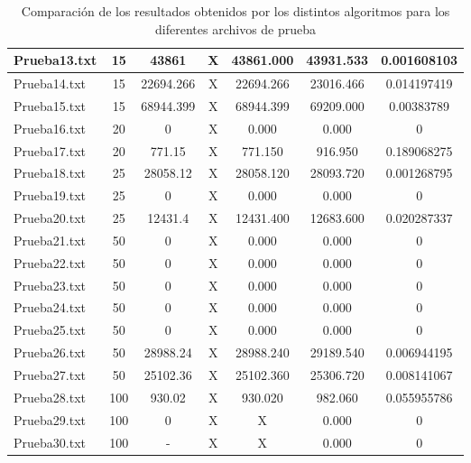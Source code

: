 \documentclass[11pt,letter]{article}
\begin{document}
\begin{table}[H]
\begin{adjustbox}{width=\textwidth}
\begin{tabular}{|l|c|c|c|c|c|c|}
\hline
Prueba13.txt & 15 & 43861 & \cellcolor{rosado}X & \cellcolor{verde}43861.000 & \cellcolor{rosado}43931.533 & 0.001608103 \\
\hline
Prueba14.txt & 15 & 22694.266 & \cellcolor{rosado}X & \cellcolor{verde}22694.266 & \cellcolor{rosado}23016.466 & 0.014197419 \\
\hline
Prueba15.txt & 15 & 68944.399 & \cellcolor{rosado}X & \cellcolor{verde}68944.399 & \cellcolor{rosado}69209.000 & 0.00383789 \\
\hline
Prueba16.txt & 20 & 0 & \cellcolor{rosado}X & \cellcolor{verde}0.000 & \cellcolor{verde}0.000 & 0 \\
\hline
Prueba17.txt & 20 & 771.15 & \cellcolor{rosado}X & \cellcolor{verde}771.150 & \cellcolor{rosado}916.950 & 0.189068275 \\
\hline
Prueba18.txt & 25 & 28058.12 & \cellcolor{rosado}X & \cellcolor{verde}28058.120 & \cellcolor{rosado}28093.720 & 0.001268795 \\
\hline
Prueba19.txt & 25 & 0 & \cellcolor{rosado}X & \cellcolor{verde}0.000 & \cellcolor{verde}0.000 & 0 \\
\hline
Prueba20.txt & 25 & 12431.4 & \cellcolor{rosado}X & \cellcolor{verde}12431.400 & \cellcolor{rosado}12683.600 & 0.020287337 \\
\hline
Prueba21.txt & 50 & 0 & \cellcolor{rosado}X & \cellcolor{verde}0.000 & \cellcolor{verde}0.000 & 0 \\
\hline
Prueba22.txt & 50 & 0 & \cellcolor{rosado}X & \cellcolor{verde}0.000 & \cellcolor{verde}0.000 & 0 \\
\hline
Prueba23.txt & 50 & 0 & \cellcolor{rosado}X & \cellcolor{verde}0.000 & \cellcolor{verde}0.000 & 0 \\
\hline
Prueba24.txt & 50 & 0 & \cellcolor{rosado}X & \cellcolor{verde}0.000 & \cellcolor{verde}0.000 & 0 \\
\hline
Prueba25.txt & 50 & 0 & \cellcolor{rosado}X & \cellcolor{verde}0.000 & \cellcolor{verde}0.000 & 0 \\
\hline
Prueba26.txt & 50 & 28988.24 & \cellcolor{rosado}X & \cellcolor{verde}28988.240 & \cellcolor{rosado}29189.540 & 0.006944195 \\
\hline
Prueba27.txt & 50 & 25102.36 & \cellcolor{rosado}X & \cellcolor{verde}25102.360 & \cellcolor{rosado}25306.720 & 0.008141067 \\
\hline
Prueba28.txt & 100 & 930.02 & \cellcolor{rosado}X & \cellcolor{verde}930.020 & \cellcolor{rosado}982.060 & 0.055955786 \\
\hline
Prueba29.txt & 100 & 0 & \cellcolor{rosado}X & \cellcolor{rosado}X & \cellcolor{verde}0.000 & 0 \\
\hline
Prueba30.txt & 100 & - & \cellcolor{rosado}X & \cellcolor{rosado}X & \cellcolor{verde}0.000 & 0 \\
\hline
\end{tabular}
\end{adjustbox}
\caption{Comparación de los resultados obtenidos por los distintos algoritmos para los diferentes archivos de prueba}
\end{table}
\end{document}
